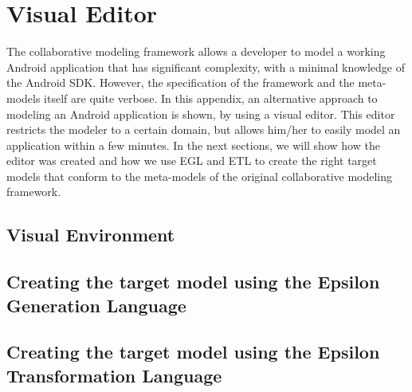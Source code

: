 \chapter{Visual Editor}
 
The collaborative modeling framework allows a developer to model a working Android application that has significant complexity, with a minimal knowledge of the Android SDK. However, the specification of the framework and the meta-models itself are quite verbose. In this appendix, an alternative approach to modeling an Android application is shown, by using a visual editor. This editor restricts the modeler to a certain domain, but allows him/her to easily model an application within a few minutes. In the next sections, we will show how the editor was created and how we use EGL and ETL to create the right target models that conform to the meta-models of the original collaborative modeling framework.

\section{Visual Environment}



\section{Creating the target model using the Epsilon Generation Language}

\section{Creating the target model using the Epsilon Transformation Language}

